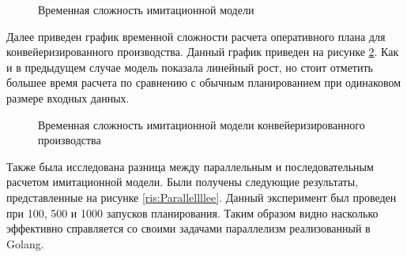 \begin{figure}[H]
    \caption{Временная сложность имитационной модели}
    \label{ris:Computational_complexity_imcore}
\end{figure}

Далее приведен график временной сложности расчета оперативного плана для конвейеризированного производства. Данный график приведен на рисунке \ref{ris:Computational_complexity_assembly}. Как и в предыдущем случае модель показала линейный рост, но стоит отметить большее время расчета по сравнению с обычным планированием при одинаковом размере входных данных.

\begin{figure}[H]
    \caption{Временная сложность имитационной модели конвейеризированного производства}
    \label{ris:Computational_complexity_assembly}
\end{figure}

Также была исследована разница между параллельным и последовательным расчетом имитационной модели. Были получены следующие результаты, представленные на рисунке \ref{ris:Parallellllee}. Данный эксперимент был проведен при 100, 500 и 1000 запусков планирования. Таким образом видно насколько эффективно справляется со своими задачами параллелизм реализованный в Golang.

